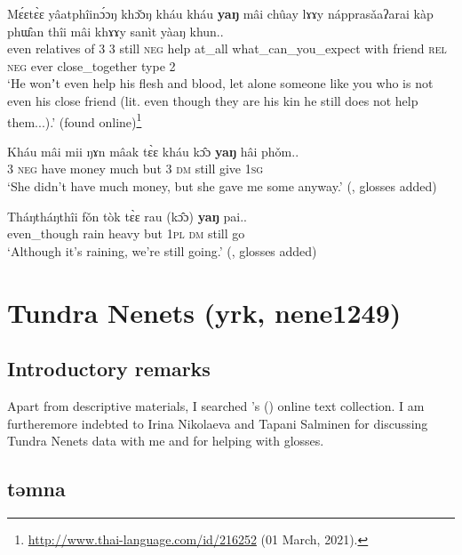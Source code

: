 \begin{exe}
	\ex\label{exAppendixThaiConcessive1}
 \gll Mɛ́ɛtɛ̀ɛ	yâatphîinɔ́ɔŋ	khɔ̌ɔŋ		kháu	kháu	\textbf{yaŋ}	mâi	chûay	lɤɤy nápprasǎaʔarai		kàp	phɯ̂an	thîi	mâi	khɤɤy		sanìt yàaŋ	khun..\\
even relatives of 3 3 still \textsc{neg} help at\_all what\_can\_you\_expect with friend \textsc{rel} \textsc{neg} ever close\_together type 2\\
\glt \lq He wonʼt even help his flesh and blood, let alone someone like you who is not even his close friend (lit. even though they are his kin he still does not help them...).' (found online)\footnote{\url{http://www.thai-language.com/id/216252} (01 March, 2021).}

	\ex\label{exAppendixThaiConcessive2}
	\gll Kháu	mâi	mii	ŋɤn		mâak		tɛ̀ɛ	kháu	kɔ̂ɔ	\textbf{yaŋ}	hâi	phǒm..\\
3 \textsc{neg} have money much but 3 \textsc{dm} still give 1\textsc{sg}\\
	\glt \lq She didn’t have much money, but she gave me some anyway.\rq{ }(\cite[107]{HigbieThinsan2002}, glosses added)

	\ex\label{exAppendixThaiConcessive3}
	\gll Tháŋtháŋthîi	fǒn	tòk		tɛ̀ɛ	rau	\textup{(}kɔ̂ɔ\textup{)}	\textbf{yaŋ}	pai..\\
even\_though rain heavy but 1\textsc{pl} \textsc{dm} still go\\
	\glt \lq Although it's raining, we're still going.' (\cite[121]{Smyth2002}, glosses added)
\end{exe}

\section{Tundra Nenets (yrk, nene1249)}
\label{appendixTundraNenets}
\subsection{Introductory remarks}
Apart from descriptive materials, I searched \citeauthor{NikolaevaEtAl2019}'s (\citeyear{NikolaevaEtAl2019}) online text collection. I am furtheremore indebted to Irina Nikolaeva and Tapani Salminen for discussing Tundra Nenets data with me and for helping with glosses.

\subsection{təmna}

